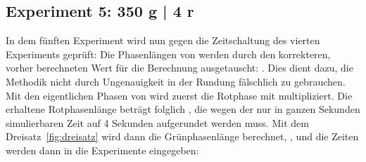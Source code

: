 %

\subsection{Experiment 5: 350 g | 4 r}\label{subsec:experiment-5}

In dem fünften Experiment wird nun gegen die Zeitschaltung des vierten Experiments geprüft:
Die Phasenlängen von  werden durch den korrekteren, vorher berechneten Wert für die Berechnung ausgetauscht:  .
Dies dient dazu, die Methodik nicht durch Ungenauigkeit in der Rundung fälschlich zu gebrauchen.
Mit den eigentlichen Phasen von  wird zuerst die Rotphase mit  multipliziert.
Die erhaltene Rotphasenlänge beträgt folglich , die wegen der nur in ganzen Sekunden simulierbaren Zeit auf 4 Sekunden aufgerundet werden muss.
Mit dem Dreisatz~\ref{fig:dreisatz} wird dann die Grünphasenlänge berechnet, , und die Zeiten werden dann in die Experimente eingegeben:

